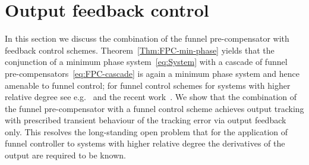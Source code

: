 \documentclass[ envcountsect, envcountsame]{svjour3}
\begin{document}
\section{Output feedback control} \label{Sec:Tracking}
In this section we discuss the combination of the funnel pre-compensator with feedback control schemes.
Theorem~\ref{Thm:FPC-min-phase} yields that the conjunction of a minimum phase system~\eqref{eq:System} 
with a cascade of funnel pre-compensators~\eqref{eq:FPC-cascade} is again a minimum phase system and hence amenable to funnel control; for funnel control schemes for systems with higher relative degree see e.g.~\cite{IlchRyan07,BergLe18a} and the recent work~\cite{BergIlch21}.
We show that the combination of the funnel pre-compensator with a funnel control scheme achieves output tracking with prescribed transient behaviour of the tracking error via output feedback only.
This resolves the long-standing open problem that for the application of funnel controller to systems with higher relative degree the derivatives of the output are required to be known.
\end{document}
